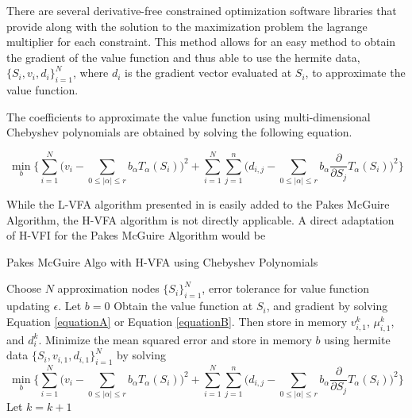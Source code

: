 \documentclass[12pt]{article}
\newcommand{\norm}[1]{\left\lVert#1\right\rVert}
\begin{document}
There are several derivative-free constrained optimization software libraries that provide along with the solution to the maximization problem the lagrange multiplier for each constraint. This method allows for an easy method to obtain the gradient of the value function and thus able to use the hermite data, $\{S_i,v_i,d_i\}_{i=1}^N$, where $d_i$ is the gradient vector evaluated at $S_i$, to approximate the value function.

The coefficients to approximate the value function using multi-dimensional Chebyshev polynomials are obtained by solving the following equation.

\begin{equation*}
  \min_b \Bigg \{\sum_{i=1}^N \bigg (v_i-\sum_{0\leq |\alpha|\leq r}b_\alpha T_\alpha(S_i) \bigg )^2+\sum_{i=1}^N \sum_{j=1}^{n} \bigg ( d_{i,j} - \sum_{0\leq |\alpha|\leq r}b_\alpha \frac{\partial}{\partial S_j}T_\alpha(S_i) \bigg )^2 \Bigg \}
\end{equation*}

While the L-VFA algorithm presented in \citet{2015_Judd_Cai} is easily added to the Pakes McGuire Algorithm, the H-VFA algorithm is not directly applicable. A direct adaptation of H-VFI for the Pakes McGuire Algorithm would be

\begin{algorithm}[H]
  \caption{Pakes McGuire Algo with H-VFA using Chebyshev Polynomials}
  \begin{algorithmic}[1]
    \Procedure{}{} Choose $N$ approximation nodes $\{S_i\}_{i=1}^N$, error tolerance for value function updating $\epsilon$.
    \State Let $b=0$
    \While{$\norm{\hat{V}^{k}_1-\hat{V}^{k-1}_1} > \frac{\epsilon (1-\beta)}{2\beta}$}
    \State Obtain the value function at $S_i$, and gradient by solving Equation \eqref{equationA} or Equation \eqref{equationB}. Then store in memory $v^k_{i,1}$, $\mu^k_{i,1}$, and $d_{i}^k$.
    \State Minimize the mean squared error and store in memory $b$ using hermite data $\{S_i,v_{i,1},d_{i,1}\}_{i=1}^N$ by solving
\begin{equation*}
  \min_b \Bigg \{\sum_{i=1}^N \bigg (v_i-\sum_{0\leq |\alpha|\leq r}b_\alpha T_\alpha(S_i) \bigg )^2+\sum_{i=1}^N \sum_{j=1}^{n} \bigg ( d_{i,j} - \sum_{0\leq |\alpha|\leq r}b_\alpha \frac{\partial}{\partial S_j}T_\alpha(S_i) \bigg )^2 \Bigg \}
\end{equation*}
    \State Let $k=k+1$
    \EndFor
    \EndWhile
    \EndProcedure
  \end{algorithmic}
\end{algorithm}
\end{document}

